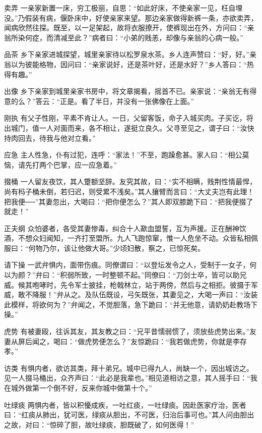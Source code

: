 \documentclass[12pt,UTF8]{ctexbook}
\begin{document}
卖弄
一亲家新置一床，穷工极丽，自思：“如此好床，不使亲家一见，枉自埋没。”乃假装有病，偃卧床中，好使亲家来望。那边亲家做得新裤一条，亦欲卖弄，闻病欣然往探。既至，以一足架起，故将衣服撩开，使裤现出在外，方问曰：“亲翁所染何症，而清减至此？”病者曰：“小弟的贱恙，却像与亲翁的心病一般。”

品茶
乡下亲家进城探望，城里亲家待以松罗泉水茶。乡人连声赞曰：“好，好。”亲翁以为彼能格物，因问曰：“亲家说好，还是茶叶好，还是水好？”乡人答曰：“热得有趣。”

出像
乡下亲家到城里亲家书房中，将文章揭看，摇首不已。亲家说：“亲翁无有得意的么？”答云：“正是。看了半日，并没有一张佛像在上面。”

刚执
有父子性刚，平素不肯让人。一日，父留客饭，命子入城买肉。子买讫，将出城门，值一人对面而来，各不相让，遂挺立良久。父寻至见之，谓子曰：“汝快持肉回去，待我与他对立看。”

应急
主人性急，仆有过犯，连呼：“家法！”不至，跑躁愈甚。家人曰：“相公莫恼，请先打两个巴掌，应一应急着。”

掇桶
一人留友夜饮，其人蹩额坚辞。友究其故，曰：“实不相瞒，贱荆性情最悍，尚有杩子桶未倒，若归迟，则受累不浅矣。”其人攘臂而言曰：“大丈夫岂有此理！把我便──”其妻忽出，大喝曰：“把你便怎么？”其人即双膝跪下曰：“把我便掇了就走！”

正夫纲
众怕婆者，各受其妻惨毒，纠合十人歃血盟誓，互为声援。正在酬神饮酒，不想众妇闻知，一齐打至盟所。九人飞跑惊窜，惟一人危坐不动。众皆私相佩服曰：“何物乃尔，该让他做大哥。”少顷妇散，察之，已惊死矣。

请下操
一武弁惧内，面带伤痕。同僚谓曰：“以登坛发令之人，受制于一女子，何以为颜？”弁曰：“积弱所致，一时整顿不起。”同僚曰：“刀剑士卒，皆可以助兄威。候其咆哮时，先令军士披挂，枪戟林立，站于两傍，然后与之相拒。彼摄于军威，敢不降服！”弁从之。及队伍既设，弓矢既张，其妻见之，大喝一声曰：“汝装此模样，将欲何为？”弁闻之，不觉胆落，急下跪曰：“并无他意，请奶奶赴教场下操。”

虎势
有被妻殴，往诉其友，其友教之曰：“兄平昔懦弱惯了，须放些虎势出来。”友妻从屏后闻之，喝曰：“做虎势便怎么？”友惊跪曰：“我若做虎势，你就是李存孝。”

访类
有惧内者，欲访其类，拜十弟兄。城中已得九人，尚缺一个，因出城访之。见一人掇马桶出，众齐声曰：“此必是我辈也。”相见道相访之意，其人摇手曰：“我在城外做第一个倒不好，反来你城中做第十个。”

吐绿痰
两惧内者，皆以积懮成疾，一吐红痰，一吐绿痰。因赴医家疗治，医者曰：“红痰从肺出，犹可医，绿痰从胆出，不可医，归治后事可也。”其人问由胆出之故，对曰：“惊碎了胆，故吐绿痰，胆既破了，如何医得！”
\end{document}
